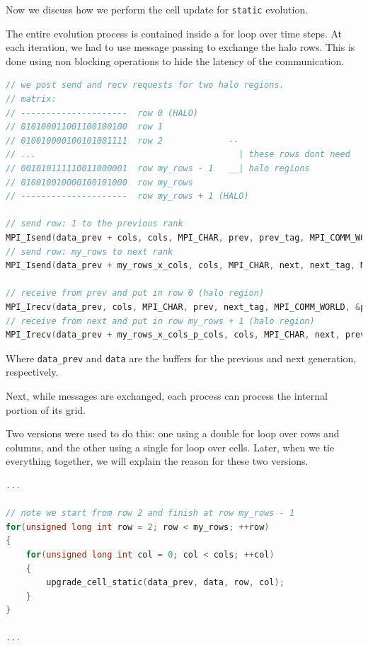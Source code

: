 \documentclass{report}
\begin{document}
Now we discuss how we perform the cell update for \texttt{static} evolution. 

The entire evolution process is contained inside a for loop over time steps. 
At each iteration, we had to use message passing to exchange the halo rows. This 
is done using non blocking operations to hide the latency of the communication.

\begin{lstlisting}[language=C++]
// we post send and recv requests for two halo regions.
// matrix: 
// ---------------------  row 0 (HALO)
// 010100011001100100100  row 1
// 010010000100101001111  row 2             --
// ...                                        | these rows dont need 
// 001010111110011000001  row my_rows - 1   __| halo regions
// 010010010000100101000  row my_rows
// ---------------------  row my_rows + 1 (HALO)

// send row: 1 to the previous rank
MPI_Isend(data_prev + cols, cols, MPI_CHAR, prev, prev_tag, MPI_COMM_WORLD, &prev_send_request);
// send row: my_rows to next rank
MPI_Isend(data_prev + my_rows_x_cols, cols, MPI_CHAR, next, next_tag, MPI_COMM_WORLD, &next_send_request);

// receive from prev and put in row 0 (halo region)
MPI_Irecv(data_prev, cols, MPI_CHAR, prev, next_tag, MPI_COMM_WORLD, &prev_recv_request);
// receive from next and put in row my_rows + 1 (halo region)
MPI_Irecv(data_prev + my_rows_x_cols_p_cols, cols, MPI_CHAR, next, prev_tag, MPI_COMM_WORLD, &next_recv_request);
\end{lstlisting}

Where \texttt{data\_prev} and \texttt{data} are the buffers for the previous 
and next generation, respectively. 

Next, while messages are exchanged, each process can process the internal portion of 
its grid.

Two versions were used to do this: one using a double for loop over rows and columns, 
and the other using a single for loop over cells. Later, when we tie everything 
together, we will explain the reason for these two versions.

\begin{lstlisting}[language=C++]
... 

// note we start from row 2 and finish at row my_rows - 1
for(unsigned long int row = 2; row < my_rows; ++row)
{
    for(unsigned long int col = 0; col < cols; ++col)
    {
        upgrade_cell_static(data_prev, data, row, col);
    }
}

...
\end{lstlisting}
\end{document}

